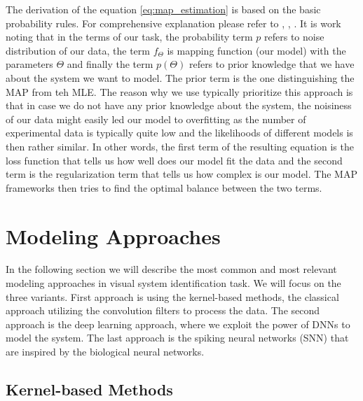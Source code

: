 The derivation of the equation \ref{eq:map_estimation} is based on the basic probability
rules. For comprehensive explanation please refer to \citet{alpaydin2020introduction}, 
\citet{wu2006complete}, \citet{annurev:/content/journals/10.1146/annurev-vision-091718-014731}.
It is work noting that in the terms of our task, the probability term $p$ refers to 
noise distribution of our data, the term $f_{\Theta}$ is mapping function (our model) 
with the parameters $\Theta$ and finally the term $p(\Theta)$ refers to prior knowledge 
that we have about the system we want to model. The prior term is the one distinguishing
the MAP from teh MLE. The reason why we use typically prioritize this approach is that in
case we do not have any prior knowledge about the system, the noisiness of our data 
might easily led our model to overfitting as the number of experimental data is typically
quite low and the likelihoods of different models is then rather similar. In other words,
the first term of the resulting equation is the loss function that tells us how well 
does our model fit the data and the second term is the regularization term that tells 
us how complex is our model. The MAP frameworks then tries to find the optimal 
balance between the two terms.


\section{Modeling Approaches}
\label{sec:modeling_approaches}
In the following section we will describe the most common and most relevant modeling
approaches in visual system identification task. We will focus on the three variants. 
First approach is using the kernel-based methods, the classical approach utilizing 
the convolution filters to process the data. The second approach is the deep learning
approach, where we exploit the power of DNNs to model the system. The last approach is 
the spiking neural networks (SNN) that are inspired by the biological neural networks.

\subsection{Kernel-based Methods}
\label{subsec:kernel_based_methods}

